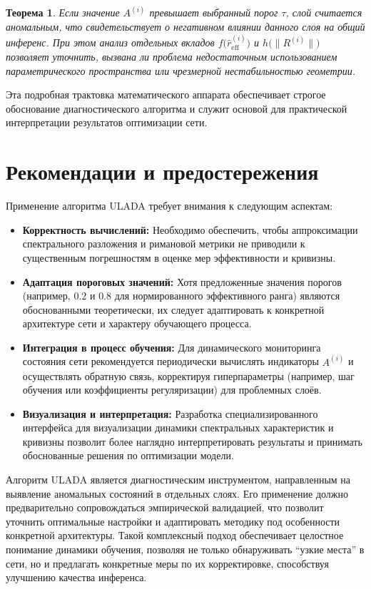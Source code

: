 \documentclass[a4paper,12pt]{article}
\newtheorem{theorem}{Теорема}
\begin{document}
\begin{theorem}
Если значение \( A^{(i)} \) превышает выбранный порог \(\tau\), слой считается аномальным, что свидетельствует о негативном влиянии данного слоя на общий инференс. При этом анализ отдельных вкладов \( f\bigl(\hat{r}_{\text{eff}}^{(i)}\bigr) \) и \( h\bigl(\|R^{(i)}\|\bigr) \) позволяет уточнить, вызвана ли проблема недостаточным использованием параметрического пространства или чрезмерной нестабильностью геометрии.
\end{theorem}

Эта подробная трактовка математического аппарата обеспечивает строгое обоснование диагностического алгоритма и служит основой для практической интерпретации результатов оптимизации сети.

\bigskip

\section{Рекомендации и предостережения}

Применение алгоритма ULADA требует внимания к следующим аспектам:
\begin{itemize}[leftmargin=1.5cm]
    \item \textbf{Корректность вычислений:} Необходимо обеспечить, чтобы аппроксимации спектрального разложения и римановой метрики не приводили к существенным погрешностям в оценке мер эффективности и кривизны.
    \item \textbf{Адаптация пороговых значений:} Хотя предложенные значения порогов (например, \(0.2\) и \(0.8\) для нормированного эффективного ранга) являются обоснованными теоретически, их следует адаптировать к конкретной архитектуре сети и характеру обучающего процесса.
    \item \textbf{Интеграция в процесс обучения:} Для динамического мониторинга состояния сети рекомендуется периодически вычислять индикаторы \( A^{(i)} \) и осуществлять обратную связь, корректируя гиперпараметры (например, шаг обучения или коэффициенты регуляризации) для проблемных слоёв.
    \item \textbf{Визуализация и интерпретация:} Разработка специализированного интерфейса для визуализации динамики спектральных характеристик и кривизны позволит более наглядно интерпретировать результаты и принимать обоснованные решения по оптимизации модели.
\end{itemize}

Алгоритм ULADA является диагностическим инструментом, направленным на выявление аномальных состояний в отдельных слоях. Его применение должно предварительно сопровождаться эмпирической валидацией, что позволит уточнить оптимальные настройки и адаптировать методику под особенности конкретной архитектуры. Такой комплексный подход обеспечивает целостное понимание динамики обучения, позволяя не только обнаруживать ``узкие места'' в сети, но и предлагать конкретные меры по их корректировке, способствуя улучшению качества инференса.
\end{document}
